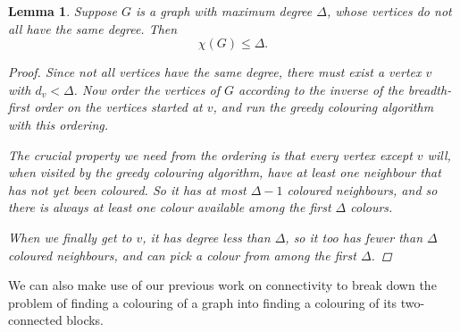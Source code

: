 \documentclass[nobib]{tufte-handout}
\newtheorem{lemma}{Lemma}
\begin{document}
\begin{lemma}\label{lemma:brooks_for_irregular}
  Suppose $G$ is a graph with maximum degree $\Delta$, whose vertices do not all have the same degree. Then
  $$\chi(G) \leq \Delta.$$

  \begin{proof}
    Since not all vertices have the same degree, there must exist a vertex $v$ with $d_v < \Delta$. Now order the vertices of $G$ according to the \emph{inverse} of the breadth-first order on the vertices started at $v$, and run the greedy colouring algorithm with this ordering.

    The crucial property we need from the ordering is that every vertex except $v$ will, when visited by the greedy colouring algorithm, have at least one neighbour that has not yet been coloured. So it has at most $\Delta - 1$ coloured neighbours, and so there is always at least one colour available among the first $\Delta$ colours.

    When we finally get to $v$, it has degree less than $\Delta$, so it too has fewer than $\Delta$ coloured neighbours, and can pick a colour from among the first $\Delta$.
  \end{proof}
\end{lemma}

We can also make use of our previous work on connectivity to break down the problem of finding a colouring of a graph into finding a colouring of its two-connected blocks.
\end{document}
